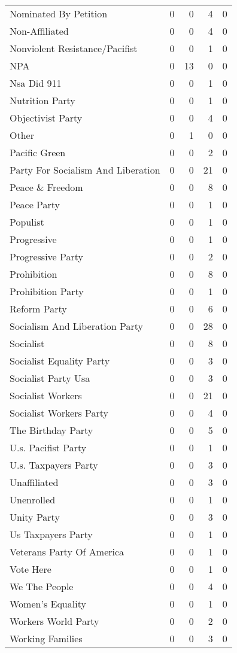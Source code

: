 \begin{supertabular}{lrrrr}
Nominated By Petition & 0 & 0 & 4 & 0\\
Non-Affiliated & 0 & 0 & 4 & 0\\
Nonviolent Resistance/Pacifist & 0 & 0 & 1 & 0\\
NPA & 0 & 13 & 0 & 0\\
Nsa Did 911 & 0 & 0 & 1 & 0\\
Nutrition Party & 0 & 0 & 1 & 0\\
Objectivist Party & 0 & 0 & 4 & 0\\
Other & 0 & 1 & 0 & 0\\
Pacific Green & 0 & 0 & 2 & 0\\
Party For Socialism And Liberation & 0 & 0 & 21 & 0\\
Peace \& Freedom & 0 & 0 & 8 & 0\\
Peace Party & 0 & 0 & 1 & 0\\
Populist & 0 & 0 & 1 & 0\\
Progressive & 0 & 0 & 1 & 0\\
Progressive Party & 0 & 0 & 2 & 0\\
Prohibition & 0 & 0 & 8 & 0\\
Prohibition Party & 0 & 0 & 1 & 0\\
Reform Party & 0 & 0 & 6 & 0\\
Socialism And Liberation Party & 0 & 0 & 28 & 0\\
Socialist & 0 & 0 & 8 & 0\\
Socialist Equality Party & 0 & 0 & 3 & 0\\
Socialist Party Usa & 0 & 0 & 3 & 0\\
Socialist Workers & 0 & 0 & 21 & 0\\
Socialist Workers Party & 0 & 0 & 4 & 0\\
The Birthday Party & 0 & 0 & 5 & 0\\
U.s. Pacifist Party & 0 & 0 & 1 & 0\\
U.s. Taxpayers Party & 0 & 0 & 3 & 0\\
Unaffiliated & 0 & 0 & 3 & 0\\
Unenrolled & 0 & 0 & 1 & 0\\
Unity Party & 0 & 0 & 3 & 0\\
Us Taxpayers Party & 0 & 0 & 1 & 0\\
Veterans Party Of America & 0 & 0 & 1 & 0\\
Vote Here & 0 & 0 & 1 & 0\\
We The People & 0 & 0 & 4 & 0\\
Women's Equality & 0 & 0 & 1 & 0\\
Workers World Party & 0 & 0 & 2 & 0\\
Working Families & 0 & 0 & 3 & 0\\
\bottomrule
\end{supertabular}

